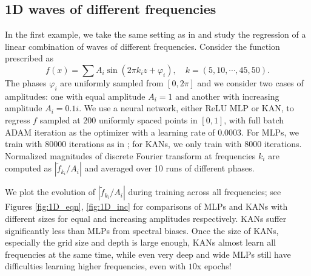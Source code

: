 \documentclass[12pt]{caltech_thesis}
\numberwithin{equation}{section}
\begin{document}
\subsection{1D waves of different frequencies}
In the first example, we take the same setting as in \cite{rahaman2019spectral} and study the regression of a linear combination of waves of different frequencies.
Consider the function prescribed as 
$$f(x)=\sum A_i \sin \left(2 \pi k_i z+\varphi_i\right),\quad k=(5,10,\cdots,45,50).$$
The phases $\varphi_i$ are uniformly sampled from $[0,2\pi]$ and we consider two cases of amplitudes: one with equal amplitude $A_i=1$ and another with increasing amplitude $A_i=0.1i$. We use a neural network, either ReLU MLP or KAN, to regress $f$ sampled at $200$ uniformly spaced points in $[0,1]$, with full batch ADAM iteration as the optimizer with a learning rate of $0.0003$. For MLPs, we train with $80000$ iterations as in \cite{rahaman2019spectral}; for KANs, we only train with 8000 iterations. Normalized magnitudes of discrete Fourier
transform at frequencies $k_i$ are computed as $|\tilde{f}_{k_i}/A_i|$ and averaged over 10 runs of different phases.

We plot the evolution of $|\tilde{f}_{k_i}/A_i|$ during training across all frequencies; see Figures \ref{fig:1D_eqn}, \ref{fig:1D_inc} for comparisons of MLPs and KANs with different sizes for equal and increasing amplitudes respectively. KANs suffer significantly less than MLPs from spectral biases. Once the size of KANs, especially the grid size and depth is large enough, KANs almost learn all frequencies at the same time, while even very deep and wide MLPs still have difficulties learning higher frequencies, even with $10$x epochs!
\end{document}

